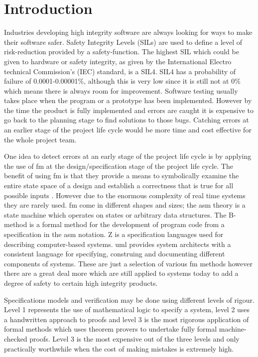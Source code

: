 
\chapter{Introduction}
\label{ch:introduction}

Industries developing high integrity software are always looking for ways to make their software safer. Safety Integrity Levels (SILs) are used to define a level of risk-reduction provided by a safety-function. The highest SIL which could be given to hardware or safety integrity, as given by the International Electro technical Commission's (IEC) standard, is a SIL4. SIL4 has a probability of failure of 0.0001-0.00001\%, although this is very low since it is still not at 0\% which means there is always room for improvement. Software testing usually takes place when the program or a prototype has been implemented. However by the time the product is fully implemented and errors are caught it is expensive to go back to the planning stage to find solutions to those bugs. Catching errors at an earlier stage of the project life cycle would be more time and cost effective for the whole project team.

One idea to detect errors at an early stage of the project life cycle is by applying the use of \gls{fm} at the design/specification stage of the project life cycle. The benefit of using \gls{fm} is that they provide a means to symbolically examine the entire state space of a design and establish a correctness that is true for all possible inputs \cite{wifrm}. However due to the enormous complexity of real time systems they are rarely used. \Gls{fm} come in different shapes and sizes; the \gls{asm} theory is a state machine which operates on states or arbitrary data structures. The B-method \cite{bmeth} is a formal method for the development of program code from a specification in the \gls{asm} notation. Z \cite{spiveyreferencemanual} is a specification languages used for describing computer-based systems. \Gls{uml} provides system architects with a consistent language for specifying, construing and documenting different components of systems. These are just a selection of various \gls{fm} methods however there are a great deal more which are still applied to systems today to add a degree of safety to certain high integrity products.

Specifications models and verification may be done using different levels of rigour. Level 1 represents the use of mathematical logic to specify a system, level 2 uses a handwritten approach to proofs and level 3 is the most rigorous application of formal methods which uses theorem provers to undertake fully formal machine-checked proofs. Level 3 is the most expensive out of the three levels and only practically worthwhile when the cost of making mistakes is extremely high.

